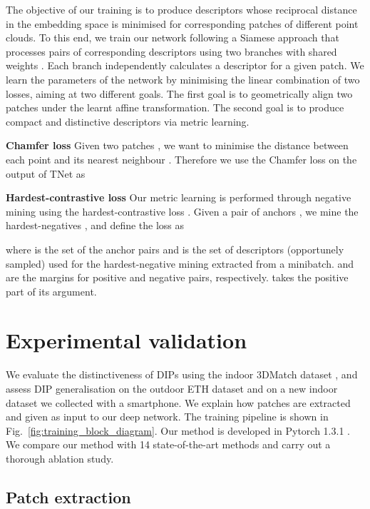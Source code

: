 \documentclass[a4paper,conference]{IEEEtran}
\begin{document}
The objective of our training is to produce descriptors whose reciprocal distance in the embedding space is minimised for corresponding patches of different point clouds.
To this end, we train our network following a Siamese approach that processes pairs of corresponding descriptors using two branches with shared weights \cite{Deng2018cvpr,Gojcic2019,Choy2019}.
Each branch independently calculates a descriptor for a given patch.
We learn the parameters of the network by minimising the linear combination of two losses, aiming at two different goals.
The first goal is to geometrically align two patches under the learnt affine transformation.
The second goal is to produce compact and distinctive descriptors via metric learning. 

\vspace{1mm}
\noindent \textbf{Chamfer loss}
Given two patches , we want to minimise the distance between each point  and its nearest neighbour . 
Therefore we use the Chamfer loss \cite{Zhao2019,Labrador2020} on the output of TNet as



\vspace{1mm}
\noindent \textbf{Hardest-contrastive loss}
Our metric learning is performed through negative mining using the hardest-contrastive loss \cite{Choy2019}.
Given a pair of anchors , we mine the hardest-negatives ,  and define the loss as 

where  is the set of the anchor pairs and  is the set of descriptors (opportunely sampled) used for the hardest-negative mining extracted from a minibatch.
 and  are the margins for positive and negative pairs, respectively.  takes the positive part of its argument.
 
\section{Experimental validation}

We evaluate the distinctiveness of DIPs using the indoor 3DMatch dataset \cite{Zeng2017}, and assess DIP generalisation on the outdoor ETH dataset \cite{Pomerleau2012} and on a new indoor dataset we collected with a smartphone.
We explain how patches are extracted and given as input to our deep network.
The training pipeline is shown in Fig.~\ref{fig:training_block_diagram}.
Our method is developed in Pytorch 1.3.1 \cite{Pytorch}.
We compare our method with 14 state-of-the-art methods and carry out a thorough ablation study.


\subsection{Patch extraction}\label{sec:patch_extraction}
\end{document}

